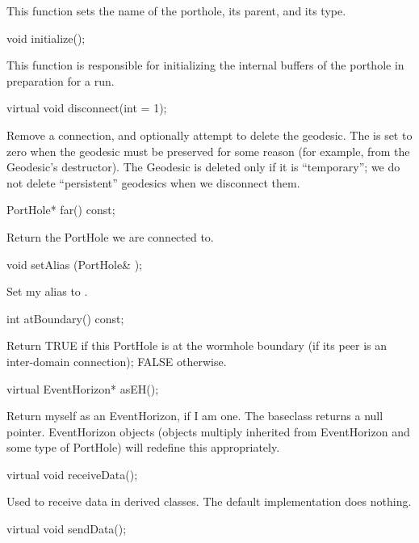 This function sets the name of the porthole, its parent, and
its type.

\begin{example}
void initialize();
\end{example}

This function is responsible for initializing the internal buffers
of the porthole in preparation for a run.

\begin{example}
virtual void disconnect(int  = 1);
\end{example}

Remove a connection, and optionally attempt to delete the geodesic.  The
is set to zero when the geodesic must be preserved for some reason (for
example, from the Geodesic's destructor).  The Geodesic is deleted only
if it is ``temporary''; we do not delete ``persistent'' geodesics when
we disconnect them.

\begin{example}
PortHole* far() const;
\end{example}

Return the PortHole we are connected to.

\begin{example}
void setAlias (PortHole& );
\end{example}

Set my alias to .

\begin{example}
int atBoundary() const;
\end{example}

Return TRUE if this PortHole is at the wormhole boundary (if its peer is
an inter-domain connection); FALSE otherwise.

\begin{example}
virtual EventHorizon* asEH();
\end{example}

Return myself as an EventHorizon, if I am one.  The baseclass returns
a null pointer.  EventHorizon objects (objects multiply inherited from
EventHorizon and some type of PortHole) will redefine this
appropriately.

\begin{example}
virtual void receiveData();
\end{example}

Used to receive data in derived classes.  The default implementation
does nothing.

\begin{example}
virtual void sendData();
\end{example}

